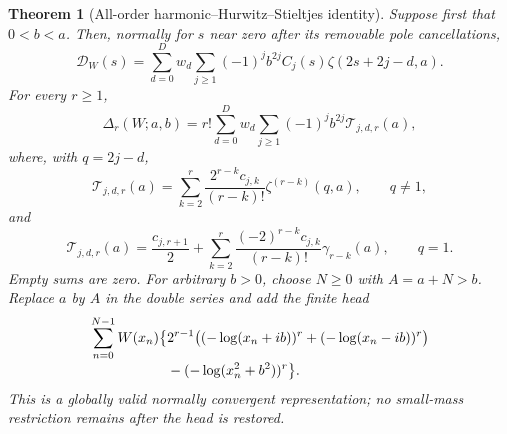 \documentclass[11pt,letterpaper]{article}
\numberwithin{equation}{section}
\newtheorem{theorem}{Theorem}[section]
\theoremstyle{definition}
\begin{document}
\begin{theorem}[All-order harmonic--Hurwitz--Stieltjes identity]
\label{hqj:thm:compiler}
Suppose first that $0<b<a$. Then, normally for $s$ near zero after its
removable pole cancellations,
\begin{equation}\label{hqj:eq:master-C}
\mathcal D_W(s)=\sum_{d=0}^D w_d\sum_{j\ge1}
(-1)^j b^{2j}C_j(s)\zeta(2s+2j-d,a).
\end{equation}
For every $r\ge1$,
\begin{equation}\label{hqj:eq:compiler}
\boxed{\Delta_r(W;a,b)
=r!\sum_{d=0}^D w_d\sum_{j\ge1}(-1)^j b^{2j}
\mathcal T_{j,d,r}(a),}
\end{equation}
where, with $q=2j-d$,
\begin{equation}\label{hqj:eq:Tnonres}
\mathcal T_{j,d,r}(a)=
\sum_{k=2}^r\frac{2^{r-k}c_{j,k}}{(r-k)!}
\zeta^{(r-k)}(q,a),\qquad q\ne1,
\end{equation}
and
\begin{equation}\label{hqj:eq:Tres}
\mathcal T_{j,d,r}(a)=\frac{c_{j,r+1}}2+
\sum_{k=2}^r\frac{(-2)^{r-k}c_{j,k}}{(r-k)!}
\gamma_{r-k}(a),\qquad q=1.
\end{equation}
Empty sums are zero. For arbitrary $b>0$, choose $N\ge0$ with $A=a+N>b$.
Replace $a$ by $A$ in the double series and add the finite head
\begin{align}
\sum_{n=0}^{N-1}W(x_n)\bigl\{
&2^{r-1}\bigl((-\log(x_n+ib))^r+(-\log(x_n-ib))^r\bigr)
\notag\\[-2pt]
&-(-\log(x_n^2+b^2))^r\bigr\}.
\label{hqj:eq:head}
\end{align}
This is a globally valid normally convergent representation; no
small-mass restriction remains after the head is restored.
\end{theorem}
\end{document}
